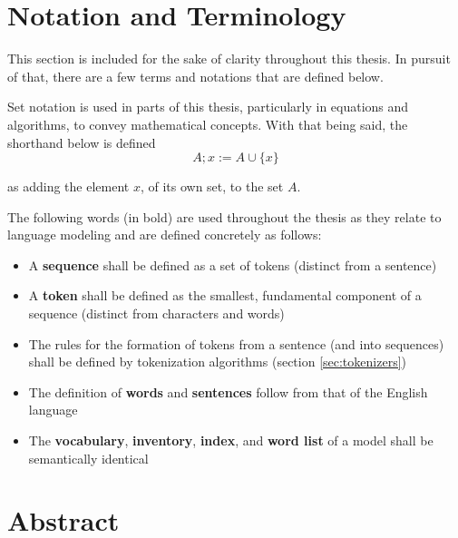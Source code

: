 \documentclass[12pt]{article}
\begin{document}
\section{Notation and Terminology}
This section is included for the sake of clarity throughout this thesis. In pursuit of that, there are a few terms and notations that are defined
below.

Set notation is used in parts of this thesis, particularly in equations and algorithms, to convey mathematical concepts. With that being said, the
shorthand below is defined
\begin{equation*}
    A; x := A \cup \{x\}
\end{equation*}

\noindent
as adding the element $x$, of its own set, to the set $A$.

The following words (in bold) are used throughout the thesis as they relate to language modeling and are defined concretely as follows:
\begin{itemize}
    \item A \textbf{sequence} shall be defined as a set of tokens (distinct from a sentence)
    \item A \textbf{token} shall be defined as the smallest, fundamental component of a sequence (distinct from characters and words)
    \item The rules for the formation of tokens from a sentence (and into sequences) shall be defined by tokenization algorithms (section
          \ref{sec:tokenizers})
    \item The definition of \textbf{words} and \textbf{sentences} follow from that of the English language
    \item The \textbf{vocabulary}, \textbf{inventory}, \textbf{index}, and \textbf{word list} of a model shall be semantically identical
\end{itemize}
\newpage

\section*{Abstract}\label{sec:abstract}
\end{document}
